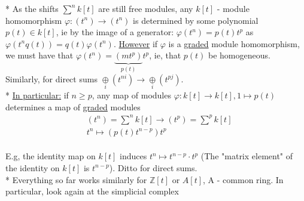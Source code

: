 \documentclass[11pt,a4paper]{report}
\begin{document}
              * As the shifts $\sum^nk[t]$ are still free modules, any $k[t]$ - module homomorphism $\varphi: (t^n) \rightarrow (t^n)$ is determined by some polynomial $p(t) \in k[t]$, ie by the image of a generator: $\varphi(t^n) = p(t)t^p$ as $\varphi(t^nq(t)) = q(t)\varphi(t^n)$. \underline{However} if $\varphi$ is a \underline{graded} module homomorphism, we must have that $\varphi(t^n) = \underbrace{(mt^p)}_{p(t)}t^p$, ie, that $p(t)$ be homogeneous. Similarly, for direct sums $\underset{i}{\oplus}(t^{ni}) \rightarrow \underset{i}{\oplus}(t^{pj})$.\\
              * \underline{In particular:} if $n \ge p$, any map of modules $\varphi: k[t] \rightarrow k[t], 1 \mapsto p(t)$ determines a map of \underline{graded} modules
              \begin{align*}
                &(t^n) = \sum^nk[t] \rightarrow (t^p) = \sum^pk[t]\\
                &t^n \mapsto (p(t)t^{n-p})t^p
              \end{align*}
              \\
              E.g, the identity map on $k[t]$ induces $t^n \mapsto t^{n-p} \cdot t^p$ (The "matrix element" of the identity on $k[t]$ is $t^{n-p}$). Ditto for direct sums.\\
              * Everything so far works similarly for $\mathbb{Z}[t]$ or $A[t]$, A - common ring. In particular, look again at the simplicial complex 
              
\end{document}
